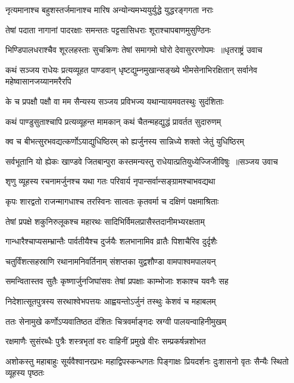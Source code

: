 \twolineshloka
{नृत्यमानाश्च बहुशस्तर्जमानाश्च मारिष}
{अन्योन्यमभ्ययुर्युद्धे युद्धरङ्गगता नराः}


\twolineshloka
{तेषां पदाता नागानां पादरक्षाः समन्ततः}
{पट्टसासिधराः शूराश्चापबाणमुसुण्ठिनः}


\threelineshloka
{भिण्डिपालधराश्चैव शूरलहस्ताः सुचक्रिणः}
{तेषां समागमो घोरो देवासुररणोपमः ॥धृतराष्ट्रं उवाच}
{}


\threelineshloka
{कथं सञ्जय राधेयः प्रत्यव्यूहत पाण्डवान्}
{धृष्टद्युम्नमुखान्सङ्ख्ये भीमसेनाभिरक्षितान्}
{सर्वानेव महेष्वासानजय्यानमरैरपि}


\twolineshloka
{के च प्रपक्षौ पक्षौ वा मम सैन्यस्य सञ्जय}
{प्रविभज्य यथान्यायमवतस्थुः सुदंशिताः}


\twolineshloka
{कथं पाण्डुसुताश्चापि प्रत्यव्यूहन्त मामकान्}
{कथं चैतन्महद्युद्धं प्रावर्तत सुदारुणम्}


\twolineshloka
{क्व च बीभत्सुरभवद्यत्कर्णोऽयाद्युधिष्ठिरम्}
{को ह्यर्जुनस्य सान्निध्ये शक्तो जेतुं युधिष्ठिरम्}


\threelineshloka
{सर्वभूतानि यो ह्येकः खाण्डवे जितबान्पुरा}
{कस्तमन्यस्तु राधेयात्प्रतियुध्येज्जिजीविषुः ॥सञ्जय उवाच}
{}


\twolineshloka
{शृणु व्यूहस्य रचनामर्जुनश्च यथा गतः}
{परिवार्य नृपान्सर्वान्सङ्ग्रामश्चाभवद्यथा}


\twolineshloka
{कृपः शारद्वतो राजन्मागधाश्च तरस्विनः}
{सात्वतः कृतवर्मा च दक्षिणं पक्षमाश्रिताः}


\twolineshloka
{तेषां प्रपक्षे शकुनिरुलूकश्च महारथः}
{सादिभिर्विमलप्रासैस्तदानीमभ्यरक्षताम्}


\twolineshloka
{गान्धारैश्चाप्यसम्भ्रान्तैः पार्वतीयैश्च दुर्जयैः}
{शलभानामिव व्रातैः पिशाचैरिव दुर्दृशैः}


\twolineshloka
{चतुर्विंशत्सहस्राणि रथानामनिवर्तिनाम्}
{संशप्तका युद्वशौण्डा वामपाश्वमपालयन्}


\twolineshloka
{समन्वितास्तव सुतैः कृष्णार्जुनजिघांसवः}
{तेषां प्रपक्षाः काम्भोजाः शकाश्च यवनैः सह}


\twolineshloka
{निदेशात्सूतपुत्रस्य सरथाश्वेभपत्तयः}
{आह्वयन्तोऽर्जुनं तस्थुः केशवं च महाबलम्}


\twolineshloka
{ततः सेनामुखे कर्णोऽप्यवातिष्ठत दंशितः}
{चित्रवर्माङ्गदः स्रग्वी पालयन्वाहिनीमुखम्}


\twolineshloka
{रक्षमाणैः सुसंरब्धैः पुत्रैः शस्त्रभृतां वरः}
{वाहिनीं प्रमुखे वीरः सम्प्रकर्षन्नशोभत}


\threelineshloka
{अशोकस्तु महाबाहुः सूर्यवैश्वानरप्रभः}
{महाद्विपस्कन्धगतः पिङ्गाक्षः प्रियदर्शनः}
{दुःशासनो वृतः सैन्यैः स्थितो व्यूहस्य पृष्ठतः}


